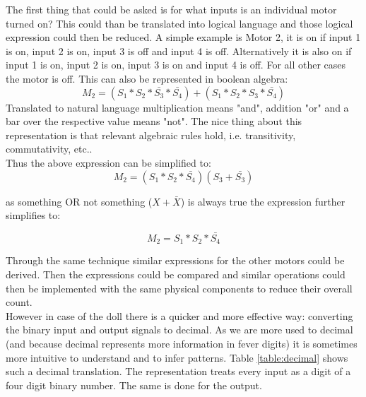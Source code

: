 \documentclass[14pt]{article}
\begin{document}
The first thing that could be asked is for what inputs is an individual motor turned on? This could than be translated into logical language
and those logical expression could then be reduced. A simple example is Motor 2, it is on if input 1 is on, input 2 is on, input 3 is off and input 4 is off.
Alternatively it is also on if input 1 is on, input 2 is on, input 3 is on and input 4 is off. For all other cases the motor is off. This can also
be represented in boolean algebra:
$$
M_2 = (S_1*S_2*\bar{S_3}*\bar{S_4}) + (S_1*S_2*S_3*\bar{S_4})
$$
Translated to natural language multiplication means "and", addition "or" and a bar over the respective value means "not". The nice thing about this
representation is that relevant algebraic rules hold, i.e. transitivity, commutativity, etc.\autocite[Page 15]{ross}.\\

Thus the above expression can be simplified to:
$$
M_2 = (S_1*S_2*\bar{S_4})(S_3+\bar{S_3})
$$

as something OR not something ($ X + \bar{X} $) is always true the expression further simplifies to:

$$
M_2 = S_1*S_2*\bar{S_4}
$$

Through the same technique similar expressions for the other motors could be derived. Then the expressions could be compared and
similar operations could then be implemented with the same physical components to reduce their overall count.\\

However in case of the doll there is a quicker and more effective way: converting the binary input and output signals to decimal. 
As we are more used to decimal (and because decimal represents more information in fever digits) it is sometimes more intuitive to understand 
and to infer patterns. Table \ref{table:decimal} shows such a decimal translation. The representation
treats every input as a digit of a four digit binary number. The same is done for the output.
\end{document}
